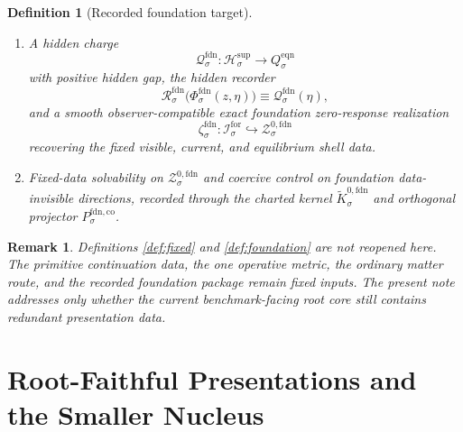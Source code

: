 \documentclass[11pt]{article}
\newcommand{\ForSpace}[1]{\mathcal I_{#1}^{\mathrm{for}}}
\newcommand{\FoundSupportShell}[1]{\mathcal Z_{#1}^{\mathrm{fdn,sup}}}
\newcommand{\FoundZeroCore}[1]{\mathcal Z_{#1}^{0,\mathrm{fdn}}}
\newcommand{\FoundZeroChart}[1]{\Psi_{#1}^{0,\mathrm{fdn}}}
\newcommand{\FoundSplit}[1]{\Phi_{#1}^{\mathrm{fdn}}}
\newcommand{\FoundCharge}[1]{\mathcal Q_{#1}^{\mathrm{fdn}}}
\newcommand{\FoundResidual}[1]{\mathcal R_{#1}^{\mathrm{fdn}}}
\newcommand{\FoundEmbed}[1]{\zeta_{#1}^{\mathrm{fdn}}}
\newcommand{\FoundKernelCh}[1]{\widetilde K_{#1}^{0,\mathrm{fdn}}}
\newcommand{\FoundStateComp}[1]{P_{#1}^{\mathrm{fdn,co}}}
\newcommand{\SeedHidden}[1]{\mathcal H_{#1}^{\mathrm{sup}}}
\newcommand{\SeedHiddenBody}[1]{D_{#1}^{\mathrm{sup}}}
\newcommand{\EqnTarget}[1]{Q_{#1}^{\mathrm{eqn}}}
\newcommand{\EqnZero}[1]{V_{#1}^{\mathrm{eqn},0}}
\newtheorem{definition}{Definition}
\newtheorem{remark}{Remark}
\begin{document}
\begin{definition}[Recorded foundation target]
\begin{enumerate}
\[    \]
    a zero chart
    \[
    \FoundZeroChart{\sigma}:\FoundZeroCore{\sigma}\to\EqnZero{\sigma},
    \]
    and a diffeomorphism
    \[
    \FoundSplit{\sigma}:
    \FoundZeroCore{\sigma}\times\SeedHiddenBody{\sigma}
    \xrightarrow{\cong}
    \FoundSupportShell{\sigma}
    \]
    obeying the same zero/hidden split in the same equation variables.
    \item A hidden charge
    \[
    \FoundCharge{\sigma}:\SeedHidden{\sigma}\to\EqnTarget{\sigma}
    \]
    with positive hidden gap, the hidden recorder
    \[
    \FoundResidual{\sigma}\bigl(\FoundSplit{\sigma}(z,\eta)\bigr)
    \equiv
    \FoundCharge{\sigma}(\eta),
    \]
    and a smooth observer-compatible exact foundation zero-response realization
    \[
    \FoundEmbed{\sigma}:\ForSpace{\sigma}\hookrightarrow\FoundZeroCore{\sigma}
    \]
    recovering the fixed visible, current, and equilibrium shell data.
    \item Fixed-data solvability on \(\FoundZeroCore{\sigma}\) and coercive control on foundation data-invisible directions, recorded through the charted kernel \(\FoundKernelCh{\sigma}\) and orthogonal projector \(\FoundStateComp{\sigma}\).
\end{enumerate}
\end{definition}

\begin{remark}
Definitions \ref{def:fixed} and \ref{def:foundation} are not reopened here. The primitive continuation data, the one operative metric, the ordinary matter route, and the recorded foundation package remain fixed inputs. The present note addresses only whether the current benchmark-facing root core still contains redundant presentation data.
\end{remark}

\section{Root-Faithful Presentations and the Smaller Nucleus}
\end{document}
